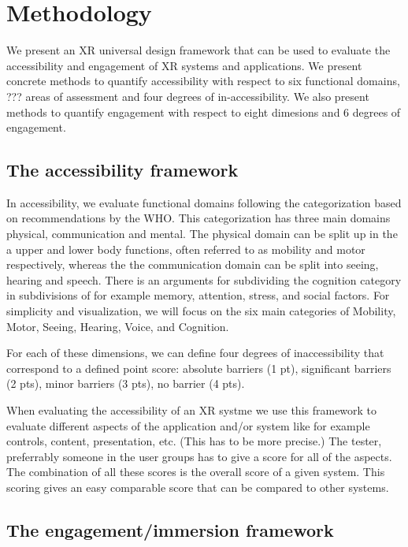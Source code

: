 \documentclass[11pt,english]{nik}
\begin{document}
\section{Methodology}

We present an XR universal design framework that can be used to evaluate the accessibility and engagement of XR systems and applications. We present concrete methods to quantify accessibility with respect to six functional domains, ??? areas of assessment and four degrees of in-accessibility. We also present methods to quantify engagement with respect to eight dimesions and 6 degrees of engagement.

\subsection{The accessibility framework}
In accessibility, we evaluate functional domains following the categorization based on recommendations by the WHO. This categorization has three main domains physical, communication and mental. The physical domain can be split up in the a upper and lower body functions, often referred to as mobility and motor respectively, whereas the the communication domain can be split into seeing, hearing and speech. There is an arguments for subdividing the cognition category in subdivisions of for example memory, attention, stress, and social factors. For simplicity and visualization, we will focus on the six main categories of Mobility, Motor, Seeing, Hearing, Voice, and Cognition.

For each of these dimensions, we can define four degrees of inaccessibility that correspond to a defined point score:
absolute barriers (1 pt), significant barriers (2 pts), minor barriers (3 pts), no barrier (4 pts).

When evaluating the accessibility of an XR systme we use this framework to evaluate different aspects of the application and/or system like for example controls, content, presentation, etc. (This has to be more precise.) The tester, preferrably someone in the user groups has to give a score for all of the aspects. The combination of all these scores is the overall score of a given system. This scoring gives an easy comparable score that can be compared to other systems.

\subsection{The engagement/immersion framework}
\end{document}
